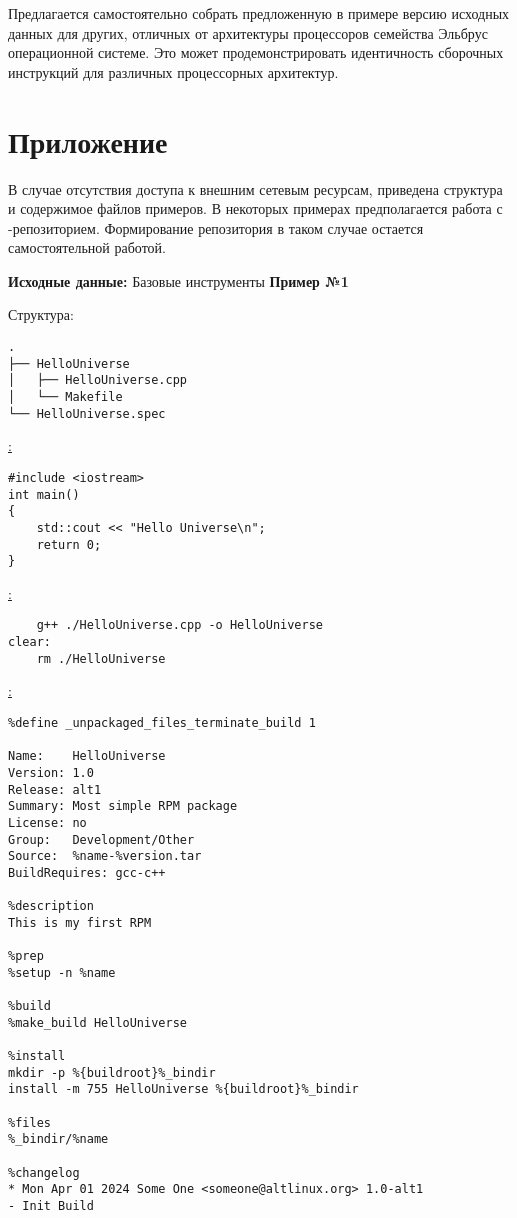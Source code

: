 Предлагается самостоятельно собрать предложенную в примере версию исходных
данных для других, отличных от архитектуры процессоров семейства Эльбрус
операционной системе. Это может продемонстрировать  идентичность сборочных
инструкций  для различных процессорных архитектур.


\section{Приложение}
В случае отсутствия доступа к внешним сетевым ресурсам, приведена структура
и содержимое файлов примеров. В некоторых примерах предполагается работа с
-репозиторием. Формирование репозитория в таком случае остается
самостоятельной работой.

\textbf{Исходные данные:} Базовые инструменты  \textbf{Пример №1}

\noindent Структура:
\begin{verbatim}
.
├── HelloUniverse
│   ├── HelloUniverse.cpp
│   └── Makefile
└── HelloUniverse.spec

\end{verbatim}

\noindent\underline{:}
\begin{verbatim}
#include <iostream>
int main()
{
    std::cout << "Hello Universe\n";
    return 0;
}

\end{verbatim}

\noindent\underline{:}
\begin{verbatim}
    g++ ./HelloUniverse.cpp -o HelloUniverse
clear:
    rm ./HelloUniverse

\end{verbatim}

\noindent\underline{:}
\begin{verbatim}
%define _unpackaged_files_terminate_build 1

Name:    HelloUniverse
Version: 1.0
Release: alt1
Summary: Most simple RPM package
License: no
Group:   Development/Other
Source:  %name-%version.tar
BuildRequires: gcc-c++

%description
This is my first RPM

%prep
%setup -n %name

%build
%make_build HelloUniverse

%install
mkdir -p %{buildroot}%_bindir
install -m 755 HelloUniverse %{buildroot}%_bindir

%files
%_bindir/%name

%changelog
* Mon Apr 01 2024 Some One <someone@altlinux.org> 1.0-alt1
- Init Build

\end{verbatim}


